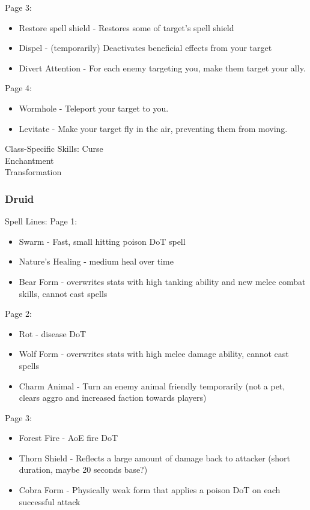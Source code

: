 \documentclass{article}
\begin{document}
Page 3:
\begin{itemize}
    \item Restore spell shield - Restores some of target's spell shield
    \item Dispel - (temporarily) Deactivates beneficial effects from your target
    \item Divert Attention - For each enemy targeting you, make them target your ally.
    
\end{itemize}

Page 4:
\begin{itemize}
    \item Wormhole - Teleport your target to you.
    \item Levitate - Make your target fly in the air, preventing them from moving.
    
\end{itemize}

Class-Specific Skills:
Curse\\
Enchantment\\
Transformation\\


\subsubsection{Druid}
Spell Lines:
Page 1:
\begin{itemize}
    \item Swarm - Fast, small hitting poison DoT spell 
    \item Nature's Healing - medium heal over time
    \item Bear Form - overwrites stats with high tanking ability and new melee combat skills, cannot cast spells
    
\end{itemize}

Page 2:
\begin{itemize}
    \item Rot - disease DoT
    \item Wolf Form - overwrites stats with high melee damage ability, cannot cast spells
    \item Charm Animal - Turn an enemy animal friendly temporarily (not a pet, clears aggro and increased faction towards players)
    
\end{itemize}

Page 3:
\begin{itemize}
    \item Forest Fire - AoE fire DoT
    \item Thorn Shield - Reflects a large amount of damage back to attacker (short duration, maybe 20 seconds base?)
    \item Cobra Form - Physically weak form that applies a poison DoT on each successful attack
    
\end{itemize}
\end{document}

